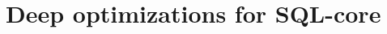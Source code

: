 \documentclass{sokendai_thesis} %
\begin{document}

\section{Deep optimizations for SQL-core}
\end{document}

